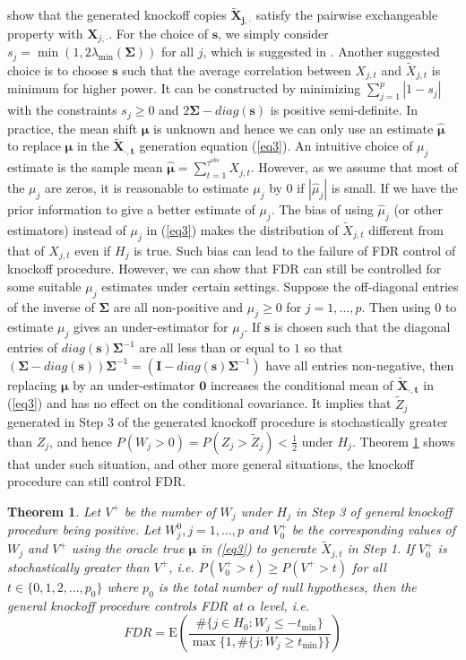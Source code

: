 \documentclass[]{interact}
\theoremstyle{plain}%
\newtheorem{theorem}{Theorem}[section]
\theoremstyle{definition}
\theoremstyle{remark}
\newcommand{\E}{\mathrm{E}}
\begin{document}
\cite{barber2015controlling} show that the generated knockoff copies $\bm{\tilde X_{j, \cdot}}$ satisfy the pairwise exchangeable property with $\bm X_{j, \cdot}$. For the choice of $\bm s$, we simply consider $s_j = \min \left(1, 2 \lambda_{\min}(\bm \Sigma)\right)$ for all $j$, which is suggested in \cite{barber2015controlling}. Another suggested choice is to choose $\bm s$ such that the average correlation between $X_{j,t}$ and $\tilde X_{j,t}$ is minimum for higher power. It can be constructed by minimizing $\sum_{j=1}^p |1 - s_j|$ with the constraints $s_j \ge 0$ and $2 \bm \Sigma - diag(\bm s)$ is positive semi-definite. In practice, the mean shift $\bm \mu$ is unknown and hence we can only use an estimate $\bm{\hat \mu}$ to replace $\bm \mu$ in the $\bm{\tilde X_{\cdot,t}}$ generation equation (\ref{eq3}). An intuitive choice of $\mu_j$ estimate is the sample mean $\bm{\hat \mu} = \sum_{t=1}^{\tau^{obs}} X_{j,t}$. However, as we assume that most of the $\mu_j$ are zeros, it is reasonable to estimate $\mu_j$ by 0 if $|\hat \mu_j|$ is small. If we have the prior information to give a better estimate of $\mu_j$. The bias of using $\hat \mu_j$ (or other estimators) instead of $\mu_j$ in (\ref{eq3}) makes the distribution of $\tilde X_{j,t}$ different from that of $X_{j,t}$ even if $H_j$ is true. Such bias can lead to the failure of FDR control of knockoff procedure. However, we can show that FDR can still be controlled for some suitable $\mu_j$ estimates under certain settings. Suppose the off-diagonal entries of the inverse of $\bm \Sigma$ are all non-positive and $\mu_j \ge 0$ for $j=1, \ldots, p$. Then using 0 to estimate $\mu_j$ gives an under-estimator for $\mu_j$. If $\bm s$ is chosen such that the diagonal entries of $diag(\bm s) \bm \Sigma^{-1}$ are all less than or equal to $1$ so that $(\bm \Sigma - diag (\bm s)) \bm \Sigma^{-1} = (\bm I - diag(\bm s) \bm \Sigma^{-1})$ have all entries non-negative, then replacing $\bm \mu$ by an under-estimator $\bm 0$ increases the conditional mean of $\bm{\tilde X_{\cdot, t}}$ in (\ref{eq3}) and has no effect on the conditional covariance. It implies that $\tilde Z_j$ generated in Step 3 of the generated knockoff procedure is stochastically greater than $Z_j$, and hence $P(W_j > 0) = P(Z_j > \tilde Z_j) < \frac{1}{2}$ under $H_j$. Theorem \ref{theo1} shows that under such situation, and other more general situations, the knockoff procedure can still control FDR.
\begin{theorem}\label{theo1}
Let $V^+$ be the number of $W_j$ under $H_j$ in Step 3 of general knockoff procedure being positive. Let $W_j^0, j=1, \ldots, p$ and $V_0^+$ be the corresponding values of $W_j$ and $V^+$ using the oracle true $\bm \mu$ in (\ref{eq3}) to generate $\tilde X_{j,t}$ in Step 1. If $V_0^+$ is stochastically greater than $V^+$, i.e. $P(V_0^+ > t) \ge P(V^+ > t)$ for all $t \in \{0, 1, 2, \ldots, p_0\}$ where $p_0$ is the total number of null hypotheses, then the general knockoff procedure controls FDR at $\alpha$ level, i.e.
\begin{equation}\label{eq4}
FDR = \E \left ( \frac{\# \{j \in H_0: W_j \le -t_{\min}\}}{\max \{1, \# \{j: W_j \ge t_{\min}\}\}}\right )
\end{equation}
\end{theorem}
\end{document}
